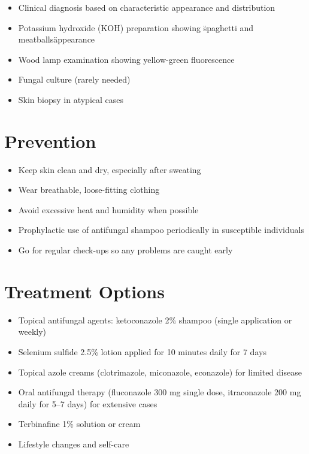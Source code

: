 \begin{itemize}[noitemsep]
  \item Clinical diagnosis based on characteristic appearance and distribution
  \item Potassium hydroxide (KOH) preparation showing \"spaghetti and meatballs\" appearance
  \item Wood lamp examination showing yellow-green fluorescence
  \item Fungal culture (rarely needed)
  \item Skin biopsy in atypical cases
\end{itemize}

\section{Prevention}

\begin{itemize}[noitemsep]
  \item Keep skin clean and dry, especially after sweating
  \item Wear breathable, loose-fitting clothing
  \item Avoid excessive heat and humidity when possible
  \item Prophylactic use of antifungal shampoo periodically in susceptible individuals
  \item Go for regular check-ups so any problems are caught early
\end{itemize}

\section{Treatment Options}

\begin{itemize}[noitemsep]
  \item Topical antifungal agents: ketoconazole 2\% shampoo (single application or weekly)
  \item Selenium sulfide 2.5\% lotion applied for 10 minutes daily for 7 days
  \item Topical azole creams (clotrimazole, miconazole, econazole) for limited disease
  \item Oral antifungal therapy (fluconazole 300 mg single dose, itraconazole 200 mg daily for 5--7 days) for extensive cases
  \item Terbinafine 1\% solution or cream
  \item Lifestyle changes and self-care
\end{itemize}

